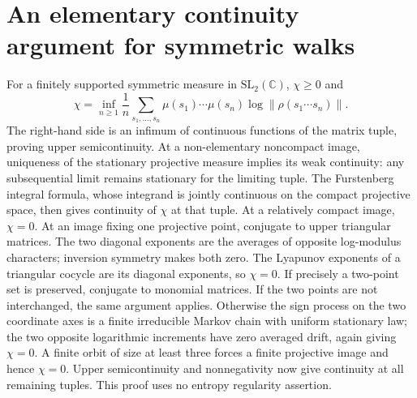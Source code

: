 \documentclass[11pt,letterpaper]{amsart}
\theoremstyle{definition}
\theoremstyle{remark}
\numberwithin{equation}{section}
\begin{document}
\appendix
\section{An elementary continuity argument for symmetric walks}\label{sec:elementary-continuity}
For a finitely supported symmetric measure in $\mathrm{SL}_2(\mathbb C)$,
$\chi\ge0$ and
\[
 \chi=\inf_{n\ge1}\frac1n\sum_{s_1,\ldots,s_n}
 \mu(s_1)\cdots\mu(s_n)
 \log\|\rho(s_1\cdots s_n)\|.
\]
The right-hand side is an infimum of continuous functions of the
matrix tuple, proving upper semicontinuity. At a non-elementary
noncompact image, uniqueness of the stationary projective measure
implies its weak continuity: any subsequential limit remains
stationary for the limiting tuple. The Furstenberg integral formula,
whose integrand is jointly continuous on the compact projective space,
then gives continuity of $\chi$ at that tuple.
At a relatively compact image, $\chi=0$. At an image fixing one
projective point, conjugate to upper triangular matrices. The two
diagonal exponents are the averages of opposite log-modulus
characters; inversion symmetry makes both zero. The Lyapunov
exponents of a triangular cocycle are its diagonal exponents, so
$\chi=0$. If precisely a two-point set is preserved, conjugate to
monomial matrices. If the two points are not interchanged, the same
argument applies. Otherwise the sign process on the two coordinate
axes is a finite irreducible Markov chain with uniform stationary
law; the two opposite logarithmic increments have zero averaged
drift, again giving $\chi=0$. A finite orbit of size at least three
forces a finite projective image and hence $\chi=0$.
Upper semicontinuity and nonnegativity now give continuity at all
remaining tuples. This proof uses no entropy regularity assertion.
\end{document}
